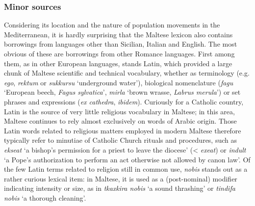 \documentclass[output=paper]{langsci/langscibook}
\begin{document}
\subsubsection{Minor sources}
Considering its location and the nature of population movements in the Mediterranean, it is hardly surprising that the Maltese lexicon also contains borrowings from languages other than Sicilian, Italian and English. %
The most obvious of these are borrowings from other Romance languages. First among them, as in other European languages, stands Latin, which provided a large chunk of Maltese scientific and technical vocabulary, whether as terminology (e.g. \textit{ego},  \textit{rektum} or  \textit{sukkursu} `underground water'), biological nomenclature (\textit{fagu} `European beech, \textit{Fagus sylvatica}', \textit{mirla} `brown wrasse, \textit{Labrus merula}') or set phrases and expressions (\textit{ex cathedra}, \textit{ibidem}). Curiously for a Catholic country, Latin is the source of very little religious vocabulary in Maltese; in this area, Maltese continues to rely almost exclusively on words of Arabic origin. Those Latin words related to religious matters employed in modern Maltese therefore typically refer to minutiae of Catholic Church rituals and procedures, such as \textit{ekseat} `a bishop's permission for a priest to leave the diocese' (< \textit{exeat}) or \textit{indult} `a Pope's authorization to perform an act otherwise not allowed by canon law'. Of the few Latin terms related to religion still in common use, \textit{nobis} stands out as a rather curious lexical item: in Maltese, it is used as a (post-nominal) modifier indicating intensity or size, as in \textit{tkaxkira nobis} `a sound thrashing' or \textit{tindifa nobis} `a thorough cleaning'. 
\end{document}
